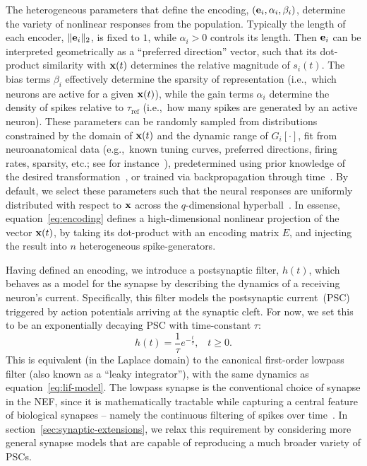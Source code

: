 The heterogeneous parameters that define the encoding, $(\mathbf{e}_i, \alpha_i, \beta_i)$, determine the variety of nonlinear responses from the population.
Typically the length of each encoder, $\| \mathbf{e}_i \|_2$, is fixed to $1$, while $\alpha_i > 0$ controls its length.
Then $\mathbf{e}_i$ can be interpreted geometrically as a ``preferred direction'' vector, such that its dot-product similarity with $\mathbf{x}(t)$ determines the relative magnitude of $s_i(t)$.
The bias terms $\beta_i$ effectively determine the sparsity of representation (i.e.,~which neurons are active for a given $\mathbf{x}(t)$), while the gain terms $\alpha_i$ determine the density of spikes relative to $\tau_\text{ref}$ (i.e.,~how many spikes are generated by an active neuron).
These parameters can be randomly sampled from distributions constrained by the domain of $\mathbf{x}(t)$ and the dynamic range of $G_i \left[ \cdot \right]$, fit from neuroanatomical data (e.g.,~known tuning curves, preferred directions, firing rates, sparsity, etc.; see for instance~\citet{voelker2016a}), predetermined using prior knowledge of the desired transformation~\citep{jgosmann2015}, or trained via backpropagation through time~\citep{rasmussen2018nengodl}.
By default, we select these parameters such that the neural responses are uniformly distributed with respect to $\mathbf{x}$ across the $q$-dimensional hyperball~\citep[][pp.~51--65]{gosmann2018}.
In essense, equation~\ref{eq:encoding} defines a high-dimensional nonlinear projection of the vector $\mathbf{x}(t)$, by taking its dot-product with an encoding matrix $E$, and injecting the result into $n$ heterogeneous spike-generators.

Having defined an encoding, we introduce a postsynaptic filter, $h(t)$, which behaves as a model for the synapse by describing the dynamics of a receiving neuron's current.
Specifically, this filter models the postsynaptic current~(PSC) triggered by action potentials arriving at the synaptic cleft.
For now, we set this to be an exponentially decaying PSC with time-constant $\tau$:
\begin{equation} \label{eq:lowpass-impulse}
h(t) = \frac{1}{\tau} e^{-\frac{t}{\tau}} \text{,} \quad t \ge 0 \text{.}
\end{equation}
This is equivalent (in the Laplace domain) to the canonical first-order lowpass filter (also known as a ``leaky integrator''), with the same dynamics as equation~\ref{eq:lif-model}.
The lowpass synapse is the conventional choice of synapse in the NEF, since it is mathematically tractable while capturing a central feature of biological synapses -- namely the continuous filtering of spikes over time~\citep{eliasmith2003a}.
In section~\ref{sec:synaptic-extensions}, we relax this requirement by considering more general synapse models that are capable of reproducing a much broader variety of PSCs.

